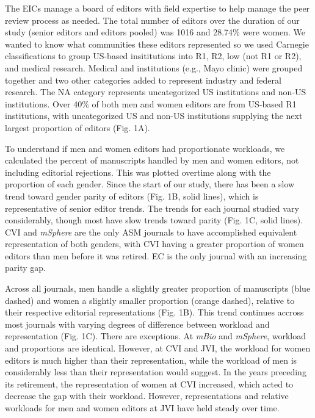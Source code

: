 \documentclass[11pt,]{article}
\begin{document}
The EICs manage a board of editors with field expertise to help manage
the peer review process as needed. The total number of editors over the
duration of our study (senior editors and editors pooled) was 1016 and
28.74\% were women. We wanted to know what communities these editors
represented so we used Carnegie classifications to group US-based
insititutions into R1, R2, low (not R1 or R2), and medical research.
Medical and institutions (e.g., Mayo clinic) were grouped together and
two other categories added to represent industry and federal research.
The NA category represents uncategorized US institutions and non-US
institutions. Over 40\% of both men and women editors are from US-based
R1 institutions, with uncategorized US and non-US institutions supplying
the next largest proportion of editors (Fig. 1A).

To understand if men and women editors had proportionate workloads, we
calculated the percent of manuscripts handled by men and women editors,
not including editorial rejections. This was plotted overtime along with
the proportion of each gender. Since the start of our study, there has
been a slow trend toward gender parity of editors (Fig. 1B, solid
lines), which is representative of senior editor trends. The trends for
each journal studied vary considerably, though most have slow trends
toward parity (Fig. 1C, solid lines). CVI and \emph{mSphere} are the
only ASM journals to have accomplished equivalent representation of both
genders, with CVI having a greater proportion of women editors than men
before it was retired. EC is the only journal with an increasing parity
gap.

Across all journals, men handle a slightly greater proportion of
manuscripts (blue dashed) and women a slightly smaller proportion
(orange dashed), relative to their respective editorial representations
(Fig. 1B). This trend continues accross most journals with varying
degrees of difference between workload and representation (Fig. 1C).
There are exceptions. At \emph{mBio} and \emph{mSphere}, workload and
proportions are identical. However, at CVI and JVI, the workload for
women editors is much higher than their representation, while the
workload of men is considerably less than their representation would
suggest. In the years preceding its retirement, the representation of
women at CVI increased, which acted to decrease the gap with their
workload. However, representations and relative workloads for men and
women editors at JVI have held steady over time.
\end{document}
